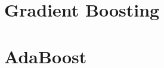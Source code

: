 \documentclass[12pt,t]{beamer}
\begin{document}
\section{Gradient Boosting}

\begin{frame}{} 

\end{frame}

\section{AdaBoost}

\begin{frame}{} 

\end{frame}
\end{document}
